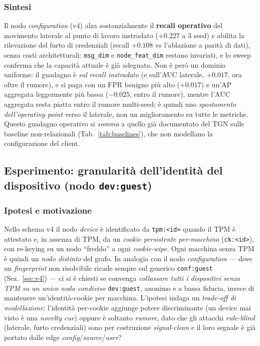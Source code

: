 \documentclass[11pt,a4paper]{report}
\begin{document}
\subsubsection{Sintesi}

Il nodo \textit{configuration} (v4) alza sostanzialmente il \textbf{recall operativo} del movimento laterale al punto di lavoro instradato ($+0.227$ a 3 seed) e abilita la rilevazione del furto di credenziali (recall $+0.108$ vs l'ablazione a parità di dati), senza costi architetturali: \texttt{msg\_dim} e \texttt{node\_feat\_dim} restano invariati, e lo sweep conferma che la capacità attuale è già adeguata. Non è però un dominio uniforme: il guadagno è \emph{sul recall instradato} (e sull'AUC laterale, $+0.017$, ora oltre il rumore), e si paga con un FPR benigno più alto ($+0.017$) e un'AP aggregata leggermente più bassa ($-0.025$, entro il rumore), mentre l'AUC aggregata resta piatta entro il rumore multi-seed; è quindi uno \textit{spostamento dell'operating point} verso il laterale, non un miglioramento su tutte le metriche. Questo guadagno operativo si \emph{somma} a quello già documentato del TGN sulle baseline non-relazionali (Tab.~\ref{tab:baselines}), che non modellano la configurazione del client.

\subsection{Esperimento: granularità dell'identità del dispositivo (nodo \texttt{dev:guest})}
\label{sec:guestdev}

\subsubsection{Ipotesi e motivazione}

Nello schema v4 il nodo \textit{device} è identificato da \texttt{tpm:<id>} quando il TPM è attestato e, in assenza di TPM, da un \emph{cookie persistente per-macchina} (\texttt{ck:<id>}), con re-keying su un nodo ``freddo'' a ogni \textit{cookie-wipe}. Ogni macchina senza TPM è quindi un \emph{nodo distinto} del grafo. In analogia con il nodo \textit{configuration} --- dove un \textit{fingerprint} non risolvibile ricade sempre sul generico \texttt{conf:guest} (Sez.~\ref{sec:v4}) --- ci si è chiesti se convenga \emph{collassare tutti i dispositivi senza TPM su un unico nodo condiviso} \texttt{dev:guest}, anonimo e a bassa fiducia, invece di mantenere un'identità-cookie per macchina. L'ipotesi indaga un \emph{trade-off di modellazione}: l'identità per-cookie aggiunge potere discriminante (un device mai visto è una \textit{novelty cue}) oppure è soltanto \emph{rumore}, dato che gli attacchi \textit{rule-blind} (laterale, furto credenziali) sono per costruzione \textit{signal-clean} e il loro segnale è già portato dalle edge \textit{config}/\textit{source}/\textit{user}?
\end{document}
